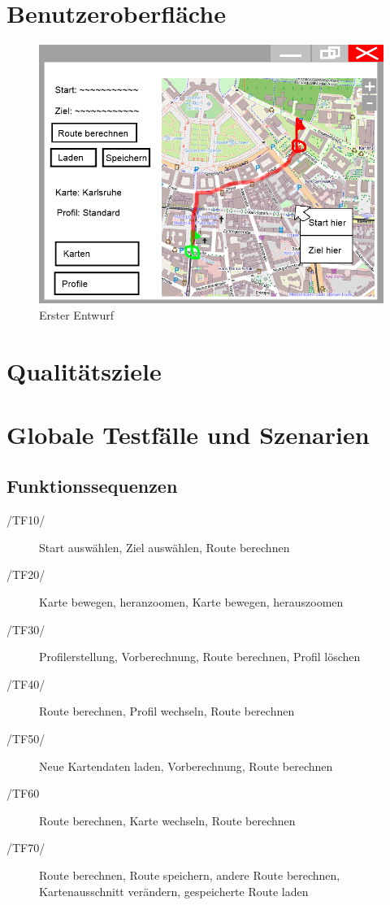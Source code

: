 \documentclass[a4paper, 11pt]{article}
\begin{document}
\section{Benutzeroberfläche}
\begin{figure}
\centering
\includegraphics[width=0.7\linewidth]{mockup_screenshot}
\caption{Erster Entwurf}
\label{fig:mockupscreenshot}
\end{figure}
\section{Qualitätsziele}
\section{Globale Testfälle und Szenarien}
\subsection{Funktionssequenzen}
\begin{description}
\item[/TF10/]
Start auswählen, Ziel auswählen, Route berechnen
\item[/TF20/]
Karte bewegen, heranzoomen, Karte bewegen, herauszoomen
\item[/TF30/]
Profilerstellung, Vorberechnung, Route berechnen, Profil löschen
\item[/TF40/]
Route berechnen, Profil wechseln, Route berechnen
\item[/TF50/]
Neue Kartendaten laden, Vorberechnung, Route berechnen
\item[/TF60]
Route berechnen, Karte wechseln, Route berechnen
\item[/TF70/]
Route berechnen, Route speichern, andere Route berechnen, Kartenausschnitt verändern, gespeicherte Route laden
\end{description}
\end{document}
